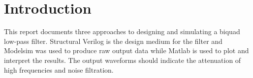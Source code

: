 \section*{Introduction}
This report documents three approaches to designing and simulating a biquad low-pass filter. Structural Verilog is the design medium for the filter and Modelsim was used to produce raw output data while Matlab is used to plot and interpret the results. The output waveforms should indicate the attenuation of high frequencies and noise filtration. 

